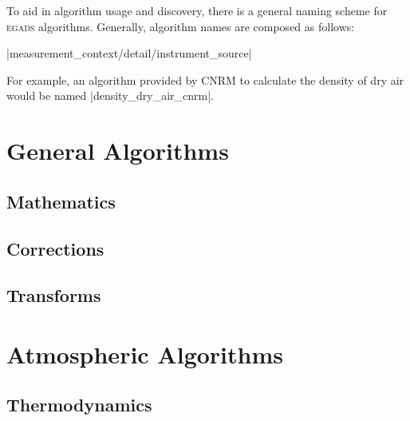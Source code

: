 \documentclass[a4paper,11pt]{report}
\newcommand{\egads}{\textsc{egads} }
\begin{document}
To aid in algorithm usage and discovery, there is a general naming scheme for \egads algorithms. Generally, algorithm names are composed as follows: 

|{measurement}_{context/detail/instrument}_{source}| 

For example, an algorithm provided by CNRM to calculate the density of dry air would be named |density_dry_air_cnrm|.




\part{General Algorithms}

\chapter{Mathematics}



\chapter{Corrections}



\chapter{Transforms}




\part{Atmospheric Algorithms}

\chapter{Thermodynamics}


\end{document}

